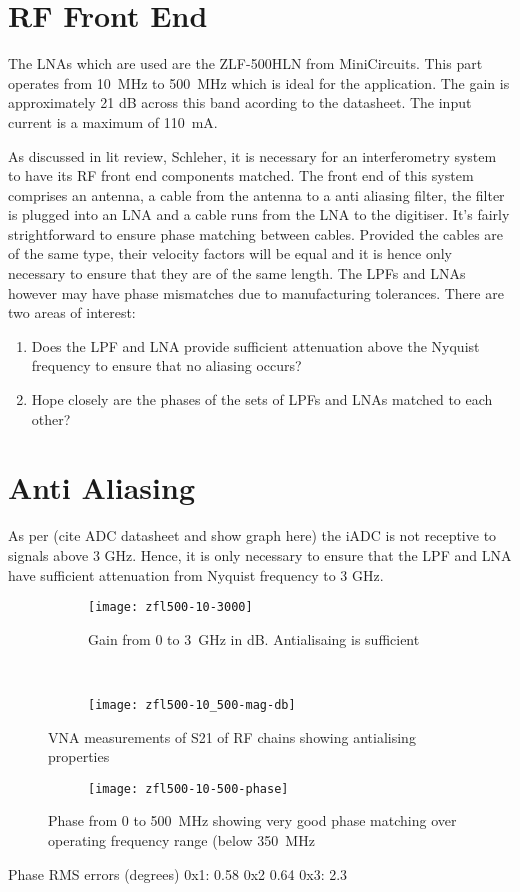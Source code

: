 \section{RF Front End}

The LNAs which are used are the ZLF-500HLN from MiniCircuits. This part operates from \SI{10}{\mega\hertz} to \SI{500}{\mega\hertz} which is ideal for the application. The gain is approximately 21 dB across this band acording to the datasheet. The input current is a maximum of \SI{110}{\milli\ampere}.

As discussed in lit review, Schleher, it is necessary for an interferometry system to have its RF front end components matched. The front end of this system comprises an antenna, a cable from the antenna to a anti aliasing filter, the filter is plugged into an LNA and a cable runs from the LNA to the digitiser. 
It's fairly strightforward to ensure phase matching between cables. Provided the cables are of the same type, their velocity factors will be equal and it is hence only necessary to ensure that they are of the same length.
The LPFs and LNAs however may have phase mismatches due to manufacturing tolerances. 
There are two areas of interest:
\begin{enumerate}
  \item Does the LPF and LNA provide sufficient attenuation above the Nyquist frequency to ensure that no aliasing occurs?
  \item Hope closely are the phases of the sets of LPFs and LNAs matched to each other?
\end{enumerate}

\section{Anti Aliasing}
As per (cite ADC datasheet and show graph here) the iADC is not receptive to signals above 3 GHz. Hence, it is only necessary to ensure that the LPF and LNA have sufficient attenuation from Nyquist frequency to 3 GHz. 

\begin{figure}
  \centering
  \begin{subfigure}{\textwidth}
    \centering
    \texttt{[image: zfl500-10-3000]}
    \caption{Gain from 0 to \SI{3}{\giga\hertz} in dB. Antialisaing is sufficient}
  \end{subfigure}\\[1em]
  \begin{subfigure}{\textwidth}
    \centering
    \texttt{[image: zfl500-10\_500-mag-db]}
  \end{subfigure}
  \caption{VNA measurements of S21 of RF chains showing antialising properties}
  \begin{subfigure}{\textwidth}
    \centering
    \texttt{[image: zfl500-10-500-phase]}
  \end{subfigure}
  \caption{Phase from 0 to \SI{500}{\mega\hertz} showing very good phase matching over operating frequency range (below \SI{350}{\mega\hertz}}
\end{figure}

Phase RMS errors (degrees)
0x1: 0.58
0x2 0.64
0x3: 2.3
